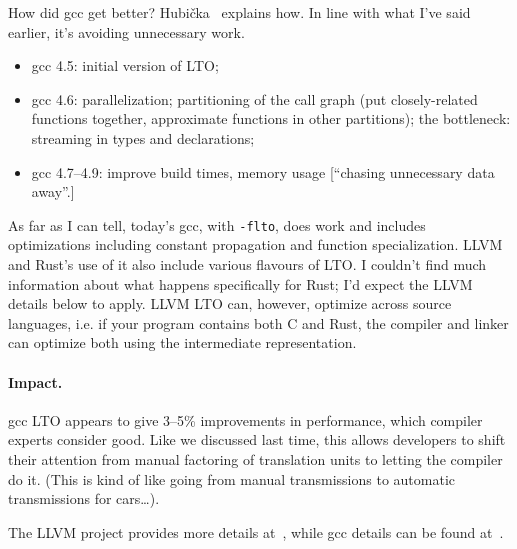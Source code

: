 How did gcc get better?
Hubi\v{c}ka~\cite{hubicka15:_link_gcc} explains how. In line with what I've said earlier, it's
avoiding unnecessary work.
\begin{itemize}[noitemsep]
\item gcc 4.5: initial version of LTO;
\item gcc 4.6: parallelization; partitioning of the call graph (put closely-related functions together, approximate functions in other partitions); the bottleneck: streaming in types and declarations;
\item gcc 4.7--4.9: improve build times, memory usage [``chasing unnecessary data away''.]
\end{itemize}
As far as I can tell, today's gcc, with {\tt -flto}, does work and includes
optimizations including constant propagation and function
specialization. LLVM and Rust's use of it also include various flavours of LTO.
I couldn't find much information about what happens specifically for Rust; I'd expect the
LLVM details below to apply. LLVM LTO can, however,
optimize across source languages, i.e. if your program contains both C and Rust,
the compiler and linker can optimize both using the intermediate representation.

\paragraph{Impact.} gcc LTO appears to give 3--5\% improvements in performance, which compiler experts consider good.
Like we discussed last time, this allows developers to shift their attention from 
manual factoring of translation units to letting the compiler do it. (This is kind of like going
from manual transmissions to automatic transmissions for cars\ldots).

The LLVM project provides more details at~\cite{project17:_llvm_link_time_optim}, while gcc details
can be found at~\cite{novillo09:_linkt}.





